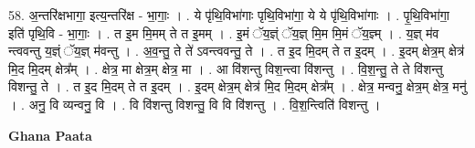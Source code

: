 \documentclass[17pt]{extarticle}
\begin{document}
58. अ॒न्तरि॑क्षभागा॒ इत्य॒न्तरि॑क्ष - भा॒गाः॒ । . ये पृ॑थि॒विभा॑गाः पृथि॒विभा॑गा॒ ये ये पृ॑थि॒विभा॑गाः । . पृ॒थि॒विभा॑गा॒ इति॑ पृथि॒वि - भा॒गाः॒ । . त इ॒म मि॒मम् ते त इ॒मम् । . इ॒मं ॅय॒ज्ञ्ं ॅय॒ज्ञ् मि॒म मि॒मं ॅय॒ज्ञ्म् । . य॒ज्ञ् म॑व न्त्ववन्तु य॒ज्ञ्ं ॅय॒ज्ञ् म॑वन्तु । . अ॒व॒न्तु॒ ते ते॑ ऽवन्त्ववन्तु॒ ते । . त इ॒द मि॒दम् ते त इ॒दम् । . इ॒दम् क्षेत्र॒म् क्षेत्र॑ मि॒द मि॒दम् क्षेत्र᳚म् । . क्षेत्र॒ मा क्षेत्र॒म् क्षेत्र॒ मा । . आ वि॑शन्तु विश॒न्त्वा वि॑शन्तु । . वि॒श॒न्तु॒ ते ते वि॑शन्तु विशन्तु॒ ते । . त इ॒द मि॒दम् ते त इ॒दम् । . इ॒दम् क्षेत्र॒म् क्षेत्र॑ मि॒द मि॒दम् क्षेत्र᳚म् । . क्षेत्र॒ मन्वनु॒ क्षेत्र॒म् क्षेत्र॒ मनु॑ । . अनु॒ वि व्यन्वनु॒ वि । . वि वि॑शन्तु विशन्तु॒ वि वि वि॑शन्तु । . वि॒श॒न्त्विति॑ विशन्तु । \newline

\textbf{Ghana Paata } \newline
\end{document}
